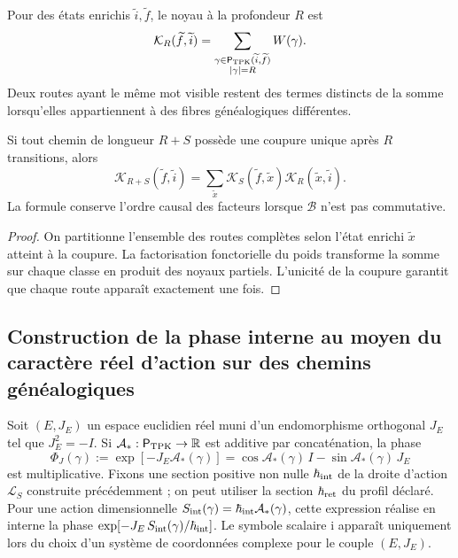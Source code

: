 Pour des états enrichis \(\widetilde i,\widetilde f\), le noyau à la
profondeur \(R\) est
\begin{equation}
 \mathcal K_R(\widetilde f,\widetilde i)
 =\sum_{\substack{
   \gamma\in\mathsf P_{\rm TPK}(\widetilde i,\widetilde f)\\
   |\gamma|=R}}
 W(\gamma).
 \label{eq:kernel-genealogico-finito-rev2}
\end{equation}
Deux routes ayant le même mot visible restent des termes distincts de la somme
lorsqu’elles appartiennent à des fibres généalogiques différentes.


\begin{proposition}
\label{prop:composicion-kernel-enriquecido-rev2}
Si tout chemin de longueur \(R+S\) possède une coupure unique après \(R\) transitions, alors
\[
 \mathcal K_{R+S}(\widetilde f,\widetilde i)
 =\sum_{\widetilde x}
 \mathcal K_S(\widetilde f,\widetilde x)
 \mathcal K_R(\widetilde x,\widetilde i).
\]
La formule conserve l’ordre causal des facteurs lorsque \(\mathcal B\) n’est pas
commutative.
\end{proposition}

\begin{proof}
On partitionne l’ensemble des routes complètes selon l’état enrichi
\(\widetilde x\) atteint à la coupure. La factorisation fonctorielle du poids
transforme la somme sur chaque classe en produit des noyaux partiels.
L’unicité de la coupure garantit que chaque route apparaît exactement une fois.

\end{proof}

\subsection{Construction de la phase interne au moyen du caractère réel d'action sur des chemins généalogiques}

Soit \((E,J_E)\) un espace euclidien réel muni d’un endomorphisme
orthogonal \(J_E\) tel que \(J_E^2=-I\). Si
\(\mathcal A_*:\mathsf P_{\rm TPK}\to\mathbb R\) est additive par
concaténation, la phase
\begin{equation}
 \Phi_J(\gamma)
 :=\exp[-J_E\mathcal A_*(\gamma)]
 =\cos\mathcal A_*(\gamma)\,I
  -\sin\mathcal A_*(\gamma)\,J_E
 \label{eq:fase-interna-caminos-rev2}
\end{equation}
est multiplicative. Fixons une section positive non nulle
\(\hbar_{\rm int}\) de la droite d’action \(\mathcal L_S\)
construite précédemment ; on peut utiliser la section
\(\hbar_{\rm ret}\) du profil déclaré.
Pour une action dimensionnelle
\(S_{\rm int}(\gamma)=\hbar_{\rm int}\mathcal A_*(\gamma)\), cette
expression réalise en interne la phase
\(\exp[-J_E\,S_{\rm int}(\gamma)/\hbar_{\rm int}]\). Le symbole scalaire
\(\mathrm i\) apparaît uniquement lors du choix d’un système de coordonnées complexe pour le couple
\((E,J_E)\).

